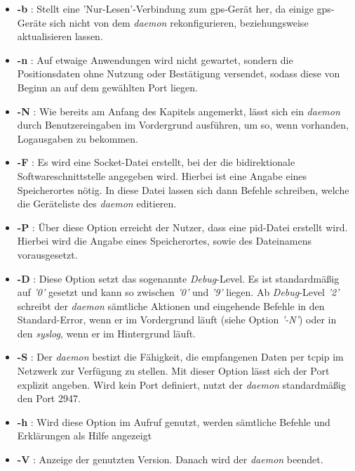 \begin{itemize}
  \item \textbf{-b} : Stellt eine 'Nur-Lesen'-Verbindung zum \ac{gps}-Gerät her, da einige \ac{gps}-Geräte sich nicht
                      von dem \emph{\ac{daemon}} rekonfigurieren, beziehungsweise aktualisieren lassen.
  \item \textbf{-n} : Auf etwaige Anwendungen wird nicht gewartet, sondern die
                      Positionsdaten ohne Nutzung oder Bestätigung versendet, sodass diese von Beginn an auf dem gewählten
                      Port liegen.
  \item \textbf{-N} : Wie bereits am Anfang des Kapitels angemerkt, lässt sich ein \emph{\ac{daemon}} durch Benutzereingaben
                      im Vordergrund ausführen, um so, wenn vorhanden, Logausgaben zu bekommen.
  \item \textbf{-F} : Es wird eine Socket-Datei erstellt, bei der die bidirektionale
                      Softwareschnittstelle angegeben wird. Hierbei ist eine Angabe eines Speicherortes nötig.
                      In diese Datei lassen sich dann Befehle schreiben, welche die Geräteliste des \emph{\ac{daemon}} editieren.
  \item \textbf{-P} : Über diese Option erreicht der Nutzer, dass eine \ac{pid}-Datei erstellt wird. Hierbei wird die Angabe
                      eines Speicherortes, sowie des Dateinamens vorausgesetzt.
  \item \textbf{-D} : Diese Option setzt das sogenannte \emph{Debug}-Level. Es ist standardmäßig auf \emph{'0'} gesetzt
                      und kann so zwischen \emph{'0'} und \emph{'9'} liegen. Ab \emph{Debug}-Level \emph{'2'} schreibt
                      der \emph{\ac{daemon}} sämtliche Aktionen und eingehende Befehle in den Standard-Error, wenn er im Vordergrund
                      läuft (siehe Option \emph{'-N'}) oder in den \emph{syslog}, wenn er im Hintergrund läuft.
  \item \textbf{-S} : Der \emph{\ac{daemon}} bestizt die Fähigkeit, die empfangenen Daten per \ac{tcpip} im Netzwerk zur
                      Verfügung zu stellen. Mit dieser Option lässt sich der Port explizit angeben. Wird kein Port
                      definiert, nutzt der \emph{\ac{daemon}} standardmäßig den Port 2947.
  \item \textbf{-h} : Wird diese Option im Aufruf genutzt, werden sämtliche Befehle und Erklärungen als Hilfe angezeigt
  \item \textbf{-V} : Anzeige der genutzten Version. Danach wird der \emph{\ac{daemon}} beendet.
\end{itemize}


